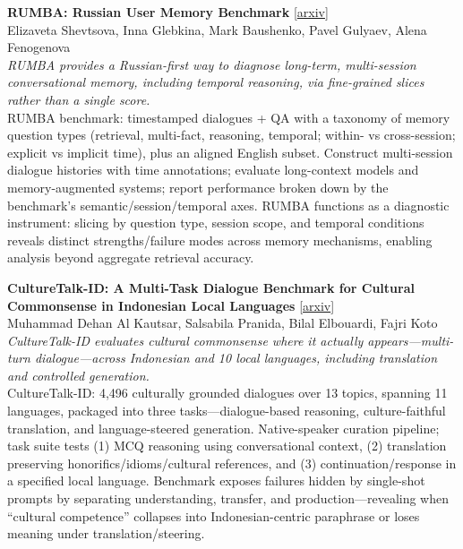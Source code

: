 \documentclass[12pt,letterpaper]{article}
\begin{document}
\medskip

{\small\textbf{RUMBA: Russian User Memory Benchmark}} {\scriptsize[\href{https://arxiv.org/abs/2607.21447}{arxiv}]}\\
{\scriptsize Elizaveta Shevtsova, Inna Glebkina, Mark Baushenko, Pavel Gulyaev, Alena Fenogenova}\\

{\small\textit{RUMBA provides a Russian-first way to diagnose long-term, multi-session conversational memory, including temporal reasoning, via fine-grained slices rather than a single score.}}\\[1pt]
{\footnotesize RUMBA benchmark: timestamped dialogues + QA with a taxonomy of memory question types (retrieval, multi-fact, reasoning, temporal; within- vs cross-session; explicit vs implicit time), plus an aligned English subset. Construct multi-session dialogue histories with time annotations; evaluate long-context models and memory-augmented systems; report performance broken down by the benchmark's semantic/session/temporal axes. RUMBA functions as a diagnostic instrument: slicing by question type, session scope, and temporal conditions reveals distinct strengths/failure modes across memory mechanisms, enabling analysis beyond aggregate retrieval accuracy.}

\medskip

{\small\textbf{CultureTalk-ID: A Multi-Task Dialogue Benchmark for Cultural Commonsense in Indonesian Local Languages}} {\scriptsize[\href{https://arxiv.org/abs/2607.21016}{arxiv}]}\\
{\scriptsize Muhammad Dehan Al Kautsar, Salsabila Pranida, Bilal Elbouardi, Fajri Koto}\\

{\small\textit{CultureTalk-ID evaluates cultural commonsense where it actually appears---multi-turn dialogue---across Indonesian and 10 local languages, including translation and controlled generation.}}\\[1pt]
{\footnotesize CultureTalk-ID: 4,496 culturally grounded dialogues over 13 topics, spanning 11 languages, packaged into three tasks---dialogue-based reasoning, culture-faithful translation, and language-steered generation. Native-speaker curation pipeline; task suite tests (1) MCQ reasoning using conversational context, (2) translation preserving honorifics/idioms/cultural references, and (3) continuation/response in a specified local language. Benchmark exposes failures hidden by single-shot prompts by separating understanding, transfer, and production---revealing when ``cultural competence'' collapses into Indonesian-centric paraphrase or loses meaning under translation/steering.}
\end{document}
